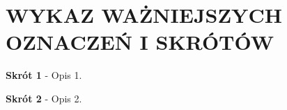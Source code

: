 \chapter*{WYKAZ WAŻNIEJSZYCH OZNACZEŃ I SKRÓTÓW}

\textbf{Skrót 1} - Opis 1.


\textbf{Skrót 2} - Opis 2.

